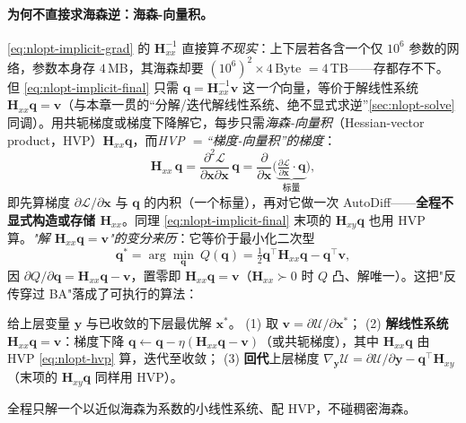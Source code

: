 \paragraph{为何不直接求海森逆：海森-向量积。}\cite{carlone2026handbook}
\cref{eq:nlopt-implicit-grad} 的 $\mathbf{H}_{xx}^{-1}$ 直接算\emph{不现实}：上下层若各含一个仅 $10^6$ 参数的网络，参数本身存 $4$\,MB，其海森却要 $(10^6)^2\times4$\,Byte $=4$\,TB——存都存不下。但 \cref{eq:nlopt-implicit-final} 只需 $\mathbf{q}=\mathbf{H}_{xx}^{-1}\mathbf{v}$ 这\emph{一个}向量，等价于解线性系统 $\mathbf{H}_{xx}\mathbf{q}=\mathbf{v}$（与本章一贯的“分解/迭代解线性系统、绝不显式求逆”\cref{sec:nlopt-solve} 同调）。用共轭梯度或梯度下降解它，每步只需\emph{海森-向量积}（Hessian-vector product，HVP）$\mathbf{H}_{xx}\mathbf{q}$，而\emph{HVP $=$“梯度-向量积”的梯度}：
\begin{equation}
  \mathbf{H}_{xx}\,\mathbf{q}=\frac{\partial^2\mathcal{L}}{\partial\mathbf{x}\partial\mathbf{x}}\,\mathbf{q}
  =\frac{\partial}{\partial\mathbf{x}}\Big(\underbrace{\tfrac{\partial\mathcal{L}}{\partial\mathbf{x}}\cdot\mathbf{q}}_{\text{标量}}\Big),
  \label{eq:nlopt-hvp}
\end{equation}
即先算梯度 $\partial\mathcal{L}/\partial\mathbf{x}$ 与 $\mathbf{q}$ 的内积（一个标量），再对它做一次 AutoDiff——\textbf{全程不显式构造或存储 $\mathbf{H}_{xx}$}。同理 \cref{eq:nlopt-implicit-final} 末项的 $\mathbf{H}_{xy}\mathbf{q}$ 也用 HVP 算。\emph{"解 $\mathbf{H}_{xx}\mathbf{q}=\mathbf{v}$"的变分来历}：它等价于最小化二次型
\begin{equation}
  \mathbf{q}^*=\arg\min_{\mathbf{q}}\ Q(\mathbf{q})=\tfrac12\mathbf{q}^\top\mathbf{H}_{xx}\mathbf{q}-\mathbf{q}^\top\mathbf{v},
  \label{eq:nlopt-implicit-quad}
\end{equation}
因 $\partial Q/\partial\mathbf{q}=\mathbf{H}_{xx}\mathbf{q}-\mathbf{v}$，置零即 $\mathbf{H}_{xx}\mathbf{q}=\mathbf{v}$（$\mathbf{H}_{xx}\succ0$ 时 $Q$ 凸、解唯一）。这把"反传穿过 BA"落成了可执行的算法：

\begin{algo}\label{alg:nlopt-implicit}
给上层变量 $\mathbf{y}$ 与已收敛的下层最优解 $\mathbf{x}^*$。
(1) 取 $\mathbf{v}=\partial\mathcal{U}/\partial\mathbf{x}^*$；
(2) \textbf{解线性系统} $\mathbf{H}_{xx}\mathbf{q}=\mathbf{v}$：梯度下降 $\mathbf{q}\leftarrow\mathbf{q}-\eta(\mathbf{H}_{xx}\mathbf{q}-\mathbf{v})$（或共轭梯度），其中 $\mathbf{H}_{xx}\mathbf{q}$ 由 HVP \cref{eq:nlopt-hvp} 算，迭代至收敛；
(3) \textbf{回代}上层梯度 $\nabla_{\mathbf{y}}\mathcal{U}=\partial\mathcal{U}/\partial\mathbf{y}-\mathbf{q}^\top\mathbf{H}_{xy}$（末项的 $\mathbf{H}_{xy}\mathbf{q}$ 同样用 HVP）。
\end{algo}
\noindent 全程只解一个以近似海森为系数的小线性系统、配 HVP，不碰稠密海森。

